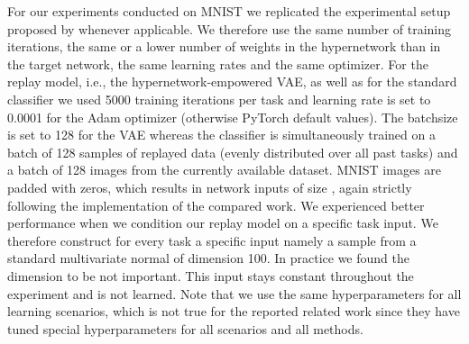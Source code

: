 \documentclass{article}
\begin{document}
For our experiments conducted on MNIST we replicated the experimental setup proposed by \cite{van_de_ven_three_2019} whenever applicable. We therefore use the same number of training iterations, the same or a lower number of weights in the hypernetwork than in the target network, the same learning rates and the same optimizer. For the replay model, i.e., the hypernetwork-empowered VAE, as well as for the standard classifier we used 5000 training iterations per task and learning rate is set to 0.0001 for the Adam optimizer (otherwise PyTorch default values). The batchsize is set to 128 for the VAE whereas the classifier is simultaneously trained on a batch of 128 samples of replayed data (evenly distributed over all past tasks) and a batch of 128 images from the currently available dataset.
MNIST images are padded with zeros, which results in network inputs of size , again strictly following the implementation of the compared work. We experienced better performance when we condition our replay model on a specific task input. We therefore construct for every task a specific input namely a sample from a standard multivariate normal of dimension 100. In practice we found the dimension to be not important. This input stays constant throughout the experiment and is not learned.
Note that we use the same hyperparameters for all learning scenarios, which is not true for the reported related work since they have tuned special hyperparameters for all scenarios and all methods.
\end{document}
